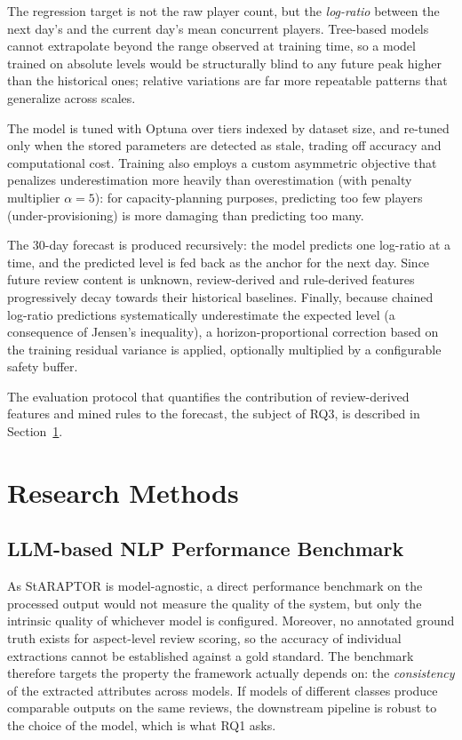 The regression target is not the raw player count, but the \emph{log-ratio} between the next day's and the current day's mean concurrent players. Tree-based models cannot extrapolate beyond the range observed at training time, so a model trained on absolute levels would be structurally blind to any future peak higher than the historical ones; relative variations are far more repeatable patterns that generalize across scales.

The model is tuned with Optuna \cite{akiba2019optuna} over tiers indexed by dataset size, and re-tuned only when the stored parameters are detected as stale, trading off accuracy and computational cost. Training also employs a custom asymmetric objective that penalizes underestimation more heavily than overestimation (with penalty multiplier $\alpha = 5$): for capacity-planning purposes, predicting too few players (under-provisioning) is more damaging than predicting too many.

The 30-day forecast is produced recursively: the model predicts one log-ratio at a time, and the predicted level is fed back as the anchor for the next day. Since future review content is unknown, review-derived and rule-derived features progressively decay towards their historical baselines. Finally, because chained log-ratio predictions systematically underestimate the expected level (a consequence of Jensen's inequality), a horizon-proportional correction based on the training residual variance is applied, optionally multiplied by a configurable safety buffer.

The evaluation protocol that quantifies the contribution of review-derived features and mined rules to the forecast, the subject of RQ3, is described in Section~\ref{sec:evaluation_methods}.

\section{Research Methods}
\label{sec:evaluation_methods}

\subsection{LLM-based NLP Performance Benchmark}
\label{sub:nlp_benchmark}

\noindent As StARAPTOR is model-agnostic, a direct performance benchmark on the processed output would not measure the quality of the system, but only the intrinsic quality of whichever model is configured. Moreover, no annotated ground truth exists for aspect-level review scoring, so the accuracy of individual extractions cannot be established against a gold standard. The benchmark therefore targets the property the framework actually depends on: the \emph{consistency} of the extracted attributes across models. If models of different classes produce comparable outputs on the same reviews, the downstream pipeline is robust to the choice of the model, which is what RQ1 asks.

